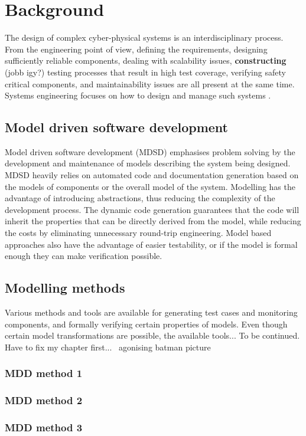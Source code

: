 \chapter{Background}
\label{chap:background}

The design of complex cyber-physical systems is an interdisciplinary process. From the engineering point of view, defining the requirements, designing sufficiently reliable components, dealing with scalability issues, \textbf{constructing} (jobb igy?) testing processes that result in high test coverage, verifying safety critical components, and maintainability issues are all present at the same time. Systems engineering focuses on how to design and manage such systems \cite{randomwikipedialink1} \cite{randomwikipedialink2}. 
\section{Model driven software development}
Model driven software development (MDSD) emphasises problem solving by the development and maintenance of models describing the system being designed. MDSD heavily relies on automated code and documentation generation based on the models of components or the overall model of the system. Modelling has the advantage of introducing abstractions, thus reducing the complexity of the development process. The dynamic code generation guarantees that the code will inherit the properties that can be directly derived from the model, while reducing the costs by eliminating unnecessary round-trip engineering. Model based approaches also have the advantage of easier testability, or if the model is formal enough they can make verification possible.
\section{Modelling methods}
Various methods and tools are available for generating test cases and monitoring components, and formally verifying certain properties of models. Even though certain model transformations are possible, the available tools... To be continued. Have to fix my chapter first... ~agonising batman picture~
  \subsection{MDD method 1}
  \subsection{MDD method 2}
  \subsection{MDD method 3}
